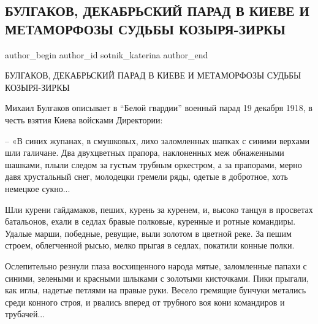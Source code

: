  
 
 
 
 
 
\subsection{БУЛГАКОВ, ДЕКАБРЬСКИЙ ПАРАД В КИЕВЕ И МЕТАМОРФОЗЫ СУДЬБЫ КОЗЫРЯ-ЗИРКЫ}
\label{sec:07_11_2019.fb.sotnik_katerina.1.bulgakov_parad_kiev}
 
\ifcmt
 author_begin
   author_id sotnik_katerina
 author_end
\fi

БУЛГАКОВ, ДЕКАБРЬСКИЙ ПАРАД В КИЕВЕ И МЕТАМОРФОЗЫ СУДЬБЫ КОЗЫРЯ-ЗИРКЫ 

Михаил Булгаков описывает в \enquote{Белой гвардии} военный парад 19 декабря 1918, в
честь взятия Киева войсками Директории:

– «В синих жупанах, в смушковых, лихо заломленных шапках с синими верхами шли
галичане. Два двухцветных прапора, наклоненных меж обнаженными шашками, плыли
следом за густым трубным оркестром, а за прапорами, мерно давя хрустальный
снег, молодецки гремели ряды, одетые в добротное, хоть немецкое сукно...

 
Шли курени гайдамаков, пеших, курень за куренем, и, высоко танцуя в
просветах батальонов, ехали в седлах бравые полковые, куренные и ротные
командиры. Удалые марши, победные, ревущие, выли золотом в цветной реке. За
пешим строем, облегченной рысью, мелко прыгая в седлах, покатили конные
полки. 

Ослепительно резнули глаза восхищенного народа мятые, заломленные папахи с
синими, зелеными и красными шлыками с золотыми кисточками. Пики прыгали, как
иглы, надетые петлями на правые руки. Весело гремящие бунчуки метались среди
конного строя, и рвались вперед от трубного воя кони командиров и
трубачей... 

